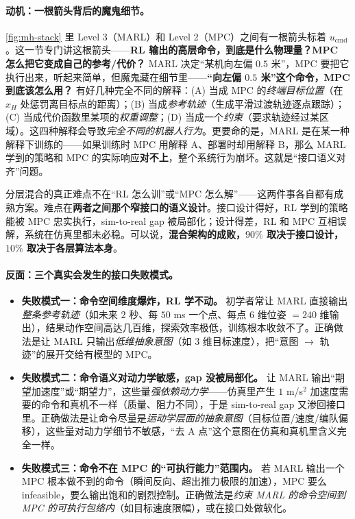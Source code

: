 \paragraph{动机：一根箭头背后的魔鬼细节。}
\cref{fig:mh-stack} 里 Level 3（MARL）和 Level 2（MPC）之间有一根箭头标着 $u_{\text{cmd}}$。这一节专门讲这根箭头——\textbf{RL 输出的高层命令，到底是什么物理量？MPC 怎么把它变成自己的参考/代价？} MARL 决定“某机向左偏 $0.5$ 米”，MPC 要把它执行出来，听起来简单，但魔鬼藏在细节里——\textbf{“向左偏 $0.5$ 米”这个命令，MPC 到底该怎么用？} 有好几种完全不同的解释：(A) 当成 MPC 的\emph{终端目标位置}（在 $x_H$ 处惩罚离目标点的距离）；(B) 当成\emph{参考轨迹}（生成平滑过渡轨迹逐点跟踪）；(C) 当成代价函数里某项的\emph{权重调整}；(D) 当成一个\emph{约束}（要求轨迹经过某区域）。这四种解释会导致\emph{完全不同的机器人行为}。更要命的是，MARL 是在某一种解释下训练的——如果训练时 MPC 用解释 A、部署时却用解释 B，那么 MARL 学到的策略和 MPC 的实际响应\textbf{对不上}，整个系统行为崩坏。这就是“接口语义对齐”问题。

\begin{insight}
分层混合的真正难点不在“RL 怎么训”或“MPC 怎么解”——这两件事各自都有成熟方案。难点在\textbf{两者之间那个窄接口的语义设计}。接口设计得好，RL 学到的策略能被 MPC 忠实执行，sim-to-real gap 被局部化；设计得差，RL 和 MPC 互相误解，系统在仿真里都未必稳。可以说，\textbf{混合架构的成败，$90\%$ 取决于接口设计，$10\%$ 取决于各层算法本身}。
\end{insight}

\paragraph{反面：三个真实会发生的接口失败模式。}
\begin{itemize}
  \item \textbf{失败模式一：命令空间维度爆炸，RL 学不动。} 初学者常让 MARL 直接输出\emph{整条参考轨迹}（如未来 $2$ 秒、每 $50$ ms 一个点、每点 $6$ 维位姿 $=240$ 维输出），结果动作空间高达几百维，探索效率极低，训练根本收敛不了。正确做法是让 MARL 只输出\emph{低维抽象意图}（如 $3$ 维目标速度），把“意图 $\to$ 轨迹”的展开交给有模型的 MPC。
  \item \textbf{失败模式二：命令语义对动力学敏感，gap 没被局部化。} 让 MARL 输出“期望加速度”或“期望力”，这些量\emph{强依赖动力学}——仿真里产生 $1$ m/s$^2$ 加速度需要的命令和真机不一样（质量、阻力不同），于是 sim-to-real gap 又渗回接口里。正确做法是让命令尽量是\emph{运动学层面的抽象意图}（目标位置/速度/编队偏移），这些量对动力学细节不敏感，“去 A 点”这个意图在仿真和真机里含义完全一样。
  \item \textbf{失败模式三：命令不在 MPC 的“可执行能力”范围内。} 若 MARL 输出一个 MPC 根本做不到的命令（瞬间反向、超出推力极限的加速），MPC 要么 infeasible，要么输出饱和的剧烈控制。正确做法是\emph{约束 MARL 的命令空间到 MPC 的可执行包络内}（如目标速度限幅），或在接口处做软化。
\end{itemize}


